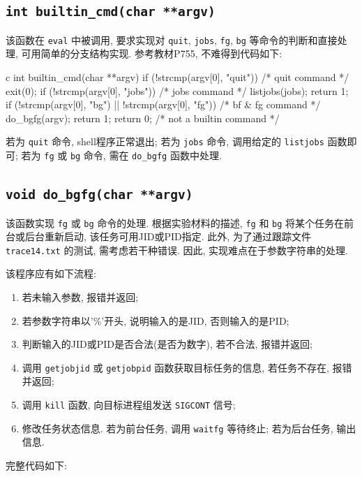 \subsection{\texttt{int builtin_cmd(char **argv)}}

该函数在 \verb|eval| 中被调用, 要求实现对 \verb|quit|, \verb|jobs|, \verb|fg|, \verb|bg| 等命令的判断和直接处理, 可用简单的分支结构实现. 参考教材P755, 不难得到代码如下:
\begin{code}{c}
int builtin_cmd(char **argv) {
  if (!strcmp(argv[0], "quit")) { /* quit command */
    exit(0);
  }
  if (!strcmp(argv[0], "jobs")) { /* jobs command */
    listjobs(jobs);
    return 1;
  }
  if (!strcmp(argv[0], "bg") || !strcmp(argv[0], "fg")) { /* bf & fg command */
    do_bgfg(argv);
    return 1;
  }
  return 0; /* not a builtin command */
}
\end{code}

若为 \verb|quit| 命令, shell程序正常退出; 若为 \verb|jobs| 命令, 调用给定的 \verb|listjobs| 函数即可; 若为 \verb|fg| 或 \verb|bg| 命令, 需在 \verb|do_bgfg| 函数中处理.

\subsection{\texttt{void do_bgfg(char **argv)}}

该函数实现 \verb|fg| 或 \verb|bg| 命令的处理. 根据实验材料的描述, \verb|fg| 和 \verb|bg| 将某个任务在前台或后台重新启动, 该任务可用JID或PID指定. 此外, 为了通过跟踪文件 \verb|trace14.txt| 的测试, 需考虑若干种错误. 因此, 实现难点在于参数字符串的处理.

该程序应有如下流程:
\begin{enumerate}
  \item 若未输入参数, 报错并返回;
  \item 若参数字符串以'\%'开头, 说明输入的是JID, 否则输入的是PID;
  \item 判断输入的JID或PID是否合法(是否为数字), 若不合法, 报错并返回;
  \item 调用 \verb|getjobjid| 或 \verb|getjobpid| 函数获取目标任务的信息, 若任务不存在, 报错并返回;
  \item 调用 \verb|kill| 函数, 向目标进程组发送 \verb|SIGCONT| 信号;
  \item 修改任务状态信息. 若为前台任务, 调用 \verb|waitfg| 等待终止; 若为后台任务, 输出信息.
\end{enumerate}

完整代码如下:

